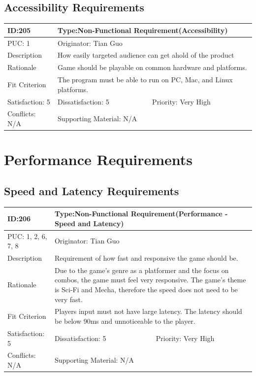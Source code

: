 \documentclass{article}
\begin{document}
	\subsection{Accessibility Requirements}
	\begin{table}[H]
		\begin{tabular}{|l|l|l|}
			\hline
			ID:205 & \multicolumn{2}{l|}{Type:Non-Functional Requirement(Accessibility)} \\ \hline
			PUC: 1 & \multicolumn{2}{l|}{Originator: Tian Guo} \\ \hline
			Description & \multicolumn{2}{m{0.85\textwidth}|}{How easily targeted audience can get ahold of the product} \\ \hline
			Rationale & \multicolumn{2}{m{0.85\textwidth}|}{Game should be playable on common hardware and platforms.} \\ \hline
			Fit Criterion & \multicolumn{2}{m{0.85\textwidth}|}{The program must be able to run on PC, Mac, and Linux platforms.} \\ \hline
			Satisfaction: 5 & Dissatisfaction: 5 & Priority: Very High \\ \hline
			Conflicts: N/A & \multicolumn{2}{l|}{Supporting Material: N/A} \\ \hline
		\end{tabular}
	\end{table}

	\section{Performance Requirements}
	\subsection{Speed and Latency Requirements}
	\begin{table}[H]
		\begin{tabular}{|l|l|l|}
			\hline
			ID:206 & \multicolumn{2}{l|}{Type:Non-Functional Requirement(Performance - Speed and Latency)} \\ \hline
			PUC: 1, 2, 6, 7, 8  & \multicolumn{2}{l|}{Originator: Tian Guo} \\ \hline
			Description & \multicolumn{2}{m{0.85\textwidth}|}{Requirement of how fast and responsive the game should be.} \\ \hline
			Rationale & \multicolumn{2}{m{0.85\textwidth}|}{Due to the game’s genre as a platformer and the focus on combos, the game must feel very responsive. The game’s theme is Sci-Fi and Mecha, therefore the speed does not need to be very fast.} \\ \hline
			Fit Criterion & \multicolumn{2}{m{0.85\textwidth}|}{Players input must not have large latency. The latency should be below 90ms and unnoticeable to the player.} \\ \hline
			Satisfaction: 5 & Dissatisfaction: 5 & Priority: Very High \\ \hline
			Conflicts: N/A & \multicolumn{2}{l|}{Supporting Material: N/A} \\ \hline
		\end{tabular}
	\end{table}
\end{document}
